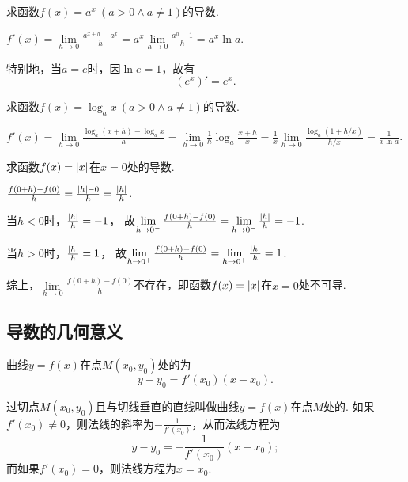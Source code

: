 \begin{example}
求函数\(f(x) = a^x\ (a > 0 \land a \neq 1)\)的导数.
\begin{solution}
\(f'(x)
= \lim\limits_{h\to0}\frac{a^{x+h}-a^x}{h}
= a^x \lim\limits_{h\to0}\frac{a^h-1}{h}
= a^x \ln a\).
\end{solution}

特别地，当\(a=e\)时，因\(\ln e = 1\)，故有\[
	(e^x)' = e^x.
\]
\end{example}

\begin{example}
求函数\(f(x) = \log_a x\ (a > 0 \land a \neq 1)\)的导数.
\begin{solution}
\(f'(x)
= \lim\limits_{h\to0}\frac{\log_a(x+h)-\log_a x}{h}
= \lim\limits_{h\to0}{\frac{1}{h} \log_a\frac{x+h}{x}}
= \frac{1}{x} \lim\limits_{h\to0}\frac{\log_a(1+h/x)}{h/x}
= \frac{1}{x \ln a}\).
\end{solution}
\end{example}

\begin{example}
求函数\(f(x) = \abs{x}\)在\(x=0\)处的导数.
\begin{solution}
\(\frac{f(0+h)-f(0)}{h} = \frac{\abs{h}-0}{h} = \frac{\abs{h}}{h}\).

当\(h < 0\)时，\(\frac{\abs{h}}{h} = -1\)，
故\(\lim\limits_{h\to0^-}\frac{f(0+h)-f(0)}{h}
= \lim\limits_{h\to0^-}\frac{\abs{h}}{h} = -1\).

当\(h > 0\)时，\(\frac{\abs{h}}{h} = 1\)，
故\(\lim\limits_{h\to0^+}\frac{f(0+h)-f(0)}{h}
= \lim\limits_{h\to0^+}\frac{\abs{h}}{h} = 1\).

综上，\(\lim\limits_{h\to0}\frac{f(0+h)-f(0)}{h}\)不存在，即函数\(f(x) = \abs{x}\)在\(x = 0\)处不可导.
\end{solution}
\end{example}

\subsection{导数的几何意义}
\begin{theorem}
曲线\(y=f(x)\)在点\(M(x_0,y_0)\)处的为\[
	y-y_0=f'(x_0)(x-x_0).
\]

过切点\(M(x_0,y_0)\)且与切线垂直的直线叫做曲线\(y=f(x)\)在点\(M\)处的.
如果\(f'(x_0) \neq 0\)，则法线的斜率为\(-\frac{1}{f'(x_0)}\)，从而法线方程为\[
	y-y_0=-\frac{1}{f'(x_0)}(x-x_0);
\]
而如果\(f'(x_0) = 0\)，则法线方程为\(x = x_0\).
\end{theorem}

